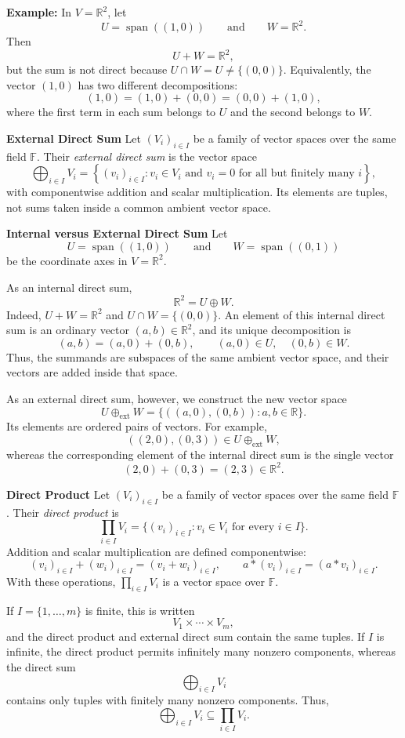 \documentclass[a4paper,11pt,abstract=true]{scrartcl}
\theoremstyle{dotlessP}
\theoremstyle{dotlessS}
\theoremstyle{remark}
\theoremstyle{definition}
\begin{document}
\begin{example_box}
\textbf{Example:} In $V=\mathbb{R}^2$, let
\[
U=\operatorname{span}((1,0))
\qquad\text{and}\qquad
W=\mathbb{R}^2.
\]
Then
\[
U+W=\mathbb{R}^2,
\]
but the sum is not direct because $U\cap W=U\neq\{(0,0)\}$. Equivalently,
the vector $(1,0)$ has two different decompositions:
\[
(1,0)=(1,0)+(0,0)=(0,0)+(1,0),
\]
where the first term in each sum belongs to $U$ and the second belongs to
$W$.
\end{example_box}

\textbf{External Direct Sum} Let ${(V_i)}_{i\in I}$ be a family
of vector spaces over the same field $\mathbb{F}$. Their \emph{external direct sum} is
the vector space
\[
\bigoplus_{i\in I}V_i
=\left\{{(v_i)}_{i\in I}:v_i\in V_i
\text{ and }v_i=0\text{ for all but finitely many }i\right\},
\]
with componentwise addition and scalar multiplication. Its elements are
tuples, not sums taken inside a common ambient vector space.

\textbf{Internal versus External Direct Sum} Let
\[
U=\operatorname{span}((1,0))
\qquad\text{and}\qquad
W=\operatorname{span}((0,1))
\]
be the coordinate axes in $V=\mathbb{R}^2$.

As an internal direct sum,
\[
\mathbb{R}^2=U\oplus W.
\]
Indeed, $U+W=\mathbb{R}^2$ and $U\cap W=\{(0,0)\}$. An element of this
internal direct sum is an ordinary vector $(a,b)\in\mathbb{R}^2$, and its
unique decomposition is
\[
(a,b)=(a,0)+(0,b),
\qquad (a,0)\in U,\quad (0,b)\in W.
\]
Thus, the summands are subspaces of the same ambient vector space, and their
vectors are added inside that space.

As an external direct sum, however, we construct the new vector space
\[
U\oplus_{\mathrm{ext}}W
=\{((a,0),(0,b)):a,b\in\mathbb{R}\}.
\]
Its elements are ordered pairs of vectors. For example,
\[
((2,0),(0,3))\in U\oplus_{\mathrm{ext}}W,
\]
whereas the corresponding element of the internal direct sum is the single
vector
\[
(2,0)+(0,3)=(2,3)\in\mathbb{R}^2.
\]

\textbf{Direct Product} Let ${(V_i)}_{i\in I}$ be a family of
vector spaces over the same field $\mathbb{F}$. Their \emph{direct product} is
\[
\prod_{i\in I}V_i
=\{{(v_i)}_{i\in I}:v_i\in V_i\text{ for every }i\in I\}.
\]
Addition and scalar multiplication are defined componentwise:
\[
{(v_i)}_{i\in I}+{(w_i)}_{i\in I}={(v_i+w_i)}_{i\in I},
\qquad
a*{(v_i)}_{i\in I}={(a*v_i)}_{i\in I}.
\]
With these operations, $\prod_{i\in I}V_i$ is a vector space over $\mathbb{F}$.

If $I=\{1,\ldots,m\}$ is finite, this is written
\[
V_1\times\cdots\times V_m,
\]
and the direct product and external direct sum contain the same tuples. If
$I$ is infinite, the direct product permits infinitely many nonzero
components, whereas the direct sum
\[
\bigoplus_{i\in I}V_i
\]
contains only tuples with finitely many nonzero components. Thus,
\[
\bigoplus_{i\in I}V_i\subseteq\prod_{i\in I}V_i.
\]
\end{document}
